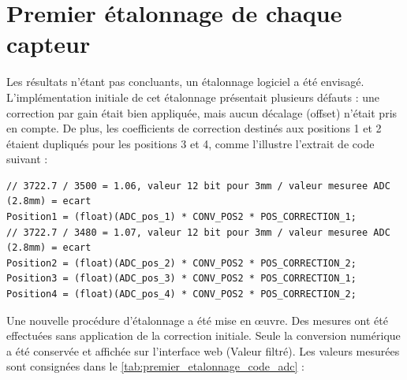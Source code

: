 \section{Premier étalonnage de chaque capteur}
Les résultats n'étant pas concluants, un étalonnage logiciel a été envisagé. L'implémentation initiale de cet étalonnage présentait plusieurs défauts : une correction par gain était bien appliquée, mais aucun décalage (offset) n'était pris en compte. De plus, les coefficients de correction destinés aux positions 1 et 2 étaient dupliqués pour les positions 3 et 4, comme l'illustre l'extrait de code suivant :

\begin{verbatim}
// 3722.7 / 3500 = 1.06, valeur 12 bit pour 3mm / valeur mesuree ADC (2.8mm) = ecart
Position1 = (float)(ADC_pos_1) * CONV_POS2 * POS_CORRECTION_1;
// 3722.7 / 3480 = 1.07, valeur 12 bit pour 3mm / valeur mesuree ADC (2.8mm) = ecart
Position2 = (float)(ADC_pos_2) * CONV_POS2 * POS_CORRECTION_2;
Position3 = (float)(ADC_pos_3) * CONV_POS2 * POS_CORRECTION_1;
Position4 = (float)(ADC_pos_4) * CONV_POS2 * POS_CORRECTION_2;
\end{verbatim}

Une nouvelle procédure d'étalonnage a été mise en œuvre. Des mesures ont été effectuées sans application de la correction initiale. Seule la conversion numérique a été conservée et affichée sur l'interface web (Valeur filtré). Les valeurs mesurées sont consignées dans le \autoref{tab:premier_etalonnage_code_adc} :

